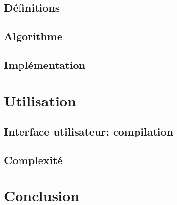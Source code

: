 \documentclass{article}
\begin{document}
\subsection{Définitions}

\subsection{Algorithme}

\subsection{Implémentation}

\section{Utilisation}

\subsection{Interface utilisateur; compilation}

\subsection{Complexité}

\section*{Conclusion}



\end{document}

